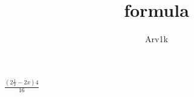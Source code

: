 \documentclass{article}
\title{formula}
\author{Arv1k}
\begin{document}
\maketitle

$\frac{(2\frac{1}{x}-2x)4}{16}$
\end{document}
